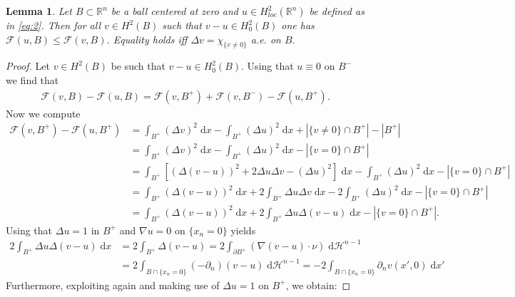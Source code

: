 \documentclass[twoside,11pt]{article}
\newtheorem{lemma}{Lemma}
\theoremstyle{definition}
\begin{document}
\begin{lemma}
\label{lem:uminimmalinball}    Let $B \subset \mathbb{R}^n$ be a ball centered at zero and  $u \in H^2_{loc}(\mathbb{R}^n)$ be defined as in \eqref{eq:2}. Then for all $v \in H^2(B)$ such that $v- u \in H_0^2(B)$ one has $\mathcal{F}(u,B) \leq \mathcal{F}(v,B)$. Equality holds iff $\Delta v = \chi_{\{v \neq 0 \} }$ a.e. on $B$. 
\end{lemma}
\begin{proof}
    Let $v \in H^2(B)$ be such that $v- u \in H_0^2(B)$. 
    Using that $u \equiv 0$ on $B^-$ we find that
    \begin{align}
        \mathcal{F}(v,B) - \mathcal{F}(u,B) =  \mathcal{F}(v,B^+) + \mathcal{F}(v,B^-) - \mathcal{F}(u,B^+). \label{eq:6}
    \end{align}
    Now we compute 
    \begin{align}
        \mathcal{F}(v,B^+) - \mathcal{F}(u,B^+) & = \int_{B^+} (\Delta v)^2 \; \mathrm{d}x - \int_{B^+} (\Delta u)^2 \; \mathrm{d}x + |\{v \neq 0 \} \cap B^+| - |B^+|  \nonumber
        \\ & = \int_{B^+} (\Delta v)^2 \; \mathrm{d}x - \int_{B^+} (\Delta u)^2 \; \mathrm{d}x - |\{ v = 0 \} \cap B^+|  \nonumber
        \\ & =\int_{B^+} [(\Delta (v -u) )^2 + 2 \Delta u \Delta v - (\Delta u)^2] \; \mathrm{d}x - \int_{B^+} (\Delta u)^2 \; \mathrm{d}x - |\{ v = 0 \} \cap B^+| \nonumber
        \\ & = \int_{B^+}(\Delta (v -u) )^2  \; \mathrm{d}x + 2 \int_{B^+} \Delta u \Delta v \; \mathrm{d}x - 2 \int_{B^+} (\Delta u)^2 \; \mathrm{d}x  - |\{ v  = 0 \} \cap B^+|  \nonumber
        \\ &= \int_{B^+}(\Delta (v -u) )^2  \; \mathrm{d}x +  2 \int_{B^+} \Delta u \Delta (v-u)  \; \mathrm{d}x - | \{ v = 0 \} \cap B^+|. \label{eq:11}
    \end{align}
    Using that $\Delta u = 1$ in $B^+$  and $\nabla u = 0$ on $\{x_n = 0 \}$ yields 
    \begin{align}
         2 \int_{B^+} \Delta u \Delta (v-u)  \; \mathrm{d}x  & = 2\int_{B^+} \Delta (v-u) = 2\int_{\partial B^+} (\nabla (v-u) \cdot \nu) \; \mathrm{d}\mathcal{H}^{n-1} \nonumber \\ &  = 2\int_{B \cap \{ x_n = 0 \}} (-\partial_n) (v-u) \; \mathrm{d}\mathcal{H}^{n-1} = - 2 \int_{B \cap \{ x_n = 0 \}} \partial_n v(x',0) \; \mathrm{d}x'  \label{eq:13} 
    \end{align}
    Furthermore, 
    exploiting again \cite[Lemma 4]{GMMathAnn} and making use of $\Delta u = 1$ on $B^+$, we obtain:

\end{proof}
\end{document}
